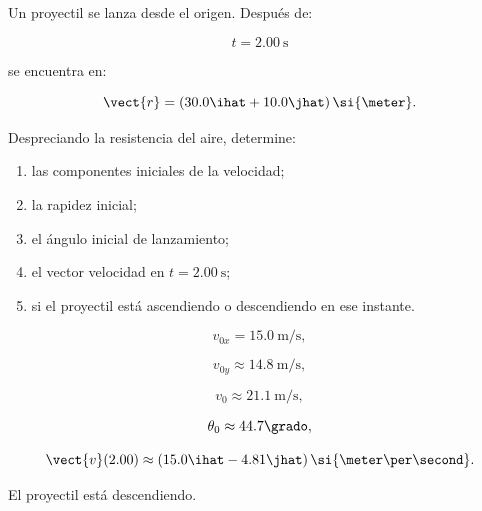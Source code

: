 \begin{ejercicio}
Un proyectil se lanza desde el origen. Después de:

\[
t=\SI{2.00}{\second}
\]

se encuentra en:

\[
\vect{r}
=
(30.0\ihat+10.0\jhat)\,\si{\meter}.
\]

Despreciando la resistencia del aire, determine:

\begin{enumerate}[label=\alph*)]
    \item las componentes iniciales de la velocidad;
    \item la rapidez inicial;
    \item el ángulo inicial de lanzamiento;
    \item el vector velocidad en \(t=\SI{2.00}{\second}\);
    \item si el proyectil está ascendiendo o descendiendo en ese instante.
\end{enumerate}
\end{ejercicio}

\begin{respuesta}
\[
v_{0x}=\SI{15.0}{\meter\per\second},
\]

\[
v_{0y}\approx\SI{14.8}{\meter\per\second},
\]

\[
v_0\approx\SI{21.1}{\meter\per\second},
\]

\[
\theta_0\approx44.7\grado,
\]

\[
\vect{v}(2.00)
\approx
(15.0\ihat-4.81\jhat)
\,\si{\meter\per\second}.
\]

El proyectil está descendiendo.
\end{respuesta}

